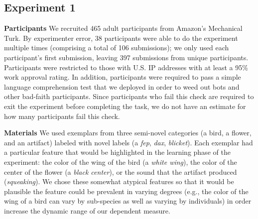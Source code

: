 \documentclass[10pt,letterpaper]{article}
\begin{document}
\subsection{Experiment 1}


\noindent\textbf{Participants}
We recruited 465 adult participants from Amazon's Mechanical Turk. 
By experimenter error, 38 participants were able to do the experiment multiple times (comprising a total of 106 submissions); we only used each participant's first submission, leaving 397 submissions from unique participants. 
Participants were restricted to those with U.S. IP addresses with at least a 95\% work approval rating. 
In addition, participants were required to pass a simple language comprehension test that we deployed in order to weed out bots and other bad-faith participants. 
Since participants who fail this check are required to exit the experiment before completing the task, we do not have an estimate for how many participants fail this check. 



\noindent\textbf{Materials}
We used exemplars from three semi-novel categories (a bird, a flower, and an artifact) labeled with novel labels (a \emph{fep}, \emph{dax}, \emph{blicket}).
Each exemplar had a particular feature that would be highlighted in the learning phase of the experiment: the color of the wing of the bird (a \emph{white wing}), the color of the center of the flower (a \emph{black center}), or the sound that the artifact produced (\emph{squeaking}). 
We chose these somewhat atypical features so that it would be plausible the feature could be prevalent in varying degrees (e.g., the color of the wing of a bird can vary by sub-species as well as varying by individuals) in order increase the dynamic range of our dependent measure. 
\end{document}
